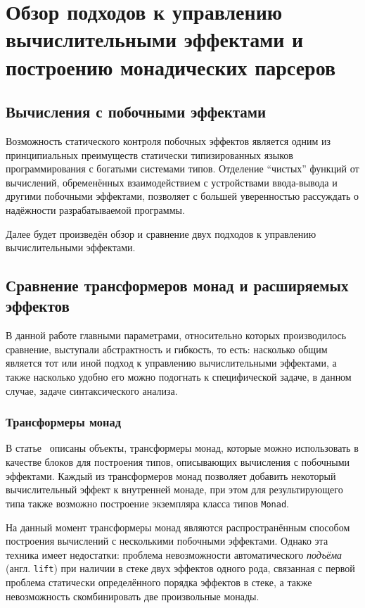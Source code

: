 \chapter{Обзор подходов к управлению вычислительными эффектами и построению
монадических парсеров}

\section{Вычисления с побочными эффектами}

  Возможность статического контроля побочных эффектов является одним из принципиальных 
  преимуществ статически типизированных языков программирования с богатыми системами типов. 
  Отделение ``чистых'' функций от вычислений, обременённых взаимодействием с 
  устройствами ввода-вывода и другими побочными эффектами, позволяет с большей
  уверенностью рассуждать о надёжности разрабатываемой программы. 

  Далее будет произведён обзор и сравнение двух подходов к управлению вычислительными 
  эффектами.   

\section{Сравнение трансформеров монад и расширяемых эффектов}
 
  В данной работе главными параметрами, относительно которых производилось сравнение, 
  выступали абстрактность и гибкость, то есть: насколько общим является тот или иной подход к управлению вычислительными эффектами, а также насколько удобно его можно подогнать к 
  специфической задаче, в данном случае, задаче синтаксического анализа.  

  \subsection{Трансформеры монад}

    В статье~\cite{monadTransformers} описаны объекты, трансформеры монад,
    которые можно использовать в качестве блоков для построения типов, описывающих
    вычисления с побочными эффектами. Каждый из трансформеров монад позволяет
    добавить некоторый вычислительный эффект к внутренней монаде, при
    этом для результирующего типа также возможно построение экземпляра класса
    типов \lstinline{Monad}.

    На данный момент трансформеры монад являются распространённым способом
    построения вычислений с несколькими побочными эффектами. Однако эта
    техника имеет недостатки: проблема невозможности автоматического
    \emph{подъёма} (англ. \lstinline{lift}) при наличии в стеке двух эффектов одного
    рода, связанная с первой проблема статически определённого порядка эффектов в
    стеке, а также невозможность скомбинировать две произвольные монады.

